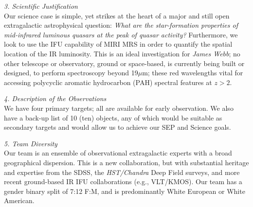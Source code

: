 \smallskip %
\smallskip \smallskip
\noindent
{\it 3. Scientific Justification}\\
Our science case is simple, yet strikes at the heart of a major and
still open extragalactic astrophysical question: {\it What are the
star-formation properties of mid-infrared luminous quasars at the peak
of quasar activity? } Furthermore, we look to use the IFU capability
of MIRI MRS in order to quantify the spatial location of the IR
luminosity.  This is an ideal investigation for {\it James Webb}; no
other telescope or observatory, ground or space-based, is currently
being built or designed, to perform spectroscopy beyond 19$\mu$m;
these red wavelengths vital for accessing polycyclic aromatic
hydrocarbon (PAH) spectral features at $z>2$.

\smallskip %
\smallskip \smallskip
\noindent
{\it 4. Description of the Observations}\\
We have four primary targets; all are available for early observation.
We also have a back-up list of 10 (ten) objects, any of which would be
suitable as secondary targets and would allow us to achieve our SEP
and Science goals.


\smallskip %
\smallskip \smallskip
\noindent
{\it 5. Team Diversity}\\
Our team is an ensemble of observational extragalactic experts with a
broad geographical dispersion. This is a new collaboration, but with
substantial heritage and expertise from 
the SDSS, 
the {\it HST/Chandra} Deep Field surveys, 
and more recent ground-based IR IFU collaborations (e.g., VLT/KMOS).  
Our team has a gender binary split of 7:12 F:M, and is
predominantly White European or White American.



